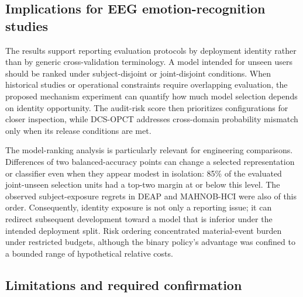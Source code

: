 \documentclass[preprint,12pt]{elsarticle}
\begin{document}
\subsection{Implications for EEG emotion-recognition studies}

The results support reporting evaluation protocols by deployment identity rather than by generic cross-validation terminology. A model intended for unseen users should be ranked under subject-disjoint or joint-disjoint conditions. When historical studies or operational constraints require overlapping evaluation, the proposed mechanism experiment can quantify how much model selection depends on identity opportunity. The audit-risk score then prioritizes configurations for closer inspection, while DCS-OPCT addresses cross-domain probability mismatch only when its release conditions are met.

The model-ranking analysis is particularly relevant for engineering comparisons. Differences of two balanced-accuracy points can change a selected representation or classifier even when they appear modest in isolation: 85\% of the evaluated joint-unseen selection units had a top-two margin at or below this level. The observed subject-exposure regrets in DEAP and MAHNOB-HCI were also of this order. Consequently, identity exposure is not only a reporting issue; it can redirect subsequent development toward a model that is inferior under the intended deployment split. Risk ordering concentrated material-event burden under restricted budgets, although the binary policy's advantage was confined to a bounded range of hypothetical relative costs.

\subsection{Limitations and required confirmation}
\end{document}
